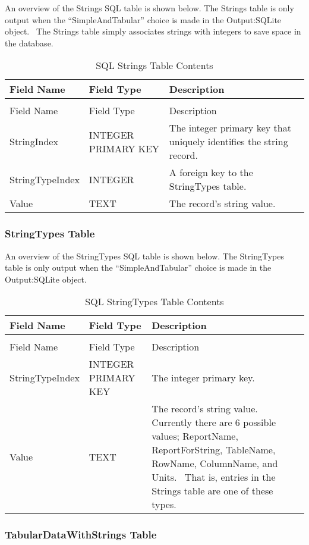 An overview of the Strings SQL table is shown below. The Strings table is only output when the “SimpleAndTabular” choice is made in the Output:SQLite object.  The Strings table simply associates strings with integers to save space in the database.

\begin{longtable}[c]{p{1.5in}p{1.5in}p{2.99in}}
\caption{SQL Strings Table Contents \label{table:table-39.-sql-strings-table-contents}} \tabularnewline
\toprule 
Field Name & Field Type & Description \tabularnewline
\midrule
\endfirsthead

\caption[]{SQL Strings Table Contents} \tabularnewline
\toprule 
Field Name & Field Type & Description \tabularnewline
\midrule
\endhead

StringIndex & INTEGER PRIMARY KEY & The integer primary key that uniquely identifies the string record. \tabularnewline
StringTypeIndex & INTEGER & A foreign key to the StringTypes table. \tabularnewline
Value & TEXT & The record’s string value. \tabularnewline
\bottomrule
\end{longtable}

\subsubsection{StringTypes Table}

An overview of the StringTypes SQL table is shown below. The StringTypes table is only output when the “SimpleAndTabular” choice is made in the Output:SQLite object.

\begin{longtable}[c]{p{1.5in}p{1.5in}p{3.0in}}
\caption{SQL StringTypes Table Contents \label{table:table-40.-sql-stringtypes-table-contents}} \tabularnewline
\toprule 
Field Name & Field Type & Description \tabularnewline
\midrule
\endfirsthead

\caption[]{SQL StringTypes Table Contents} \tabularnewline
\toprule 
Field Name & Field Type & Description \tabularnewline
\midrule
\endhead

StringTypeIndex & INTEGER PRIMARY KEY & The integer primary key. \tabularnewline
Value & TEXT & The record’s string value.~ Currently there are 6 possible values; ReportName, ReportForString, TableName, RowName, ColumnName, and Units.~ That is, entries in the Strings table are one of these types. \tabularnewline
\bottomrule
\end{longtable}

\subsubsection{TabularDataWithStrings Table}

